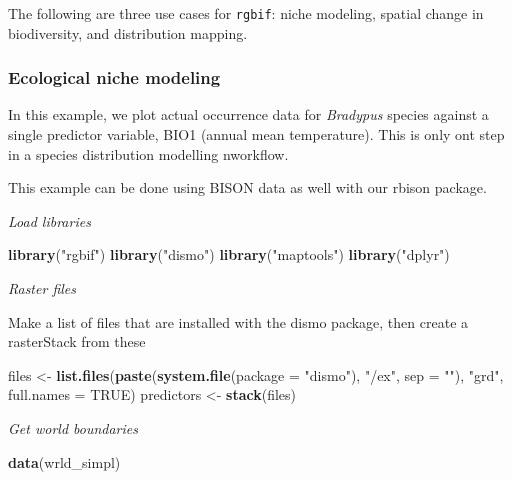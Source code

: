 \documentclass[author-year, review, 11pt]{components/elsarticle} %
\newenvironment{Shaded}{\begin{snugshade}}{\end{snugshade}}
\newcommand{\KeywordTok}[1]{\textcolor[rgb]{0.13,0.29,0.53}{\textbf{{#1}}}}
\newcommand{\DataTypeTok}[1]{\textcolor[rgb]{0.13,0.29,0.53}{{#1}}}
\newcommand{\StringTok}[1]{\textcolor[rgb]{0.31,0.60,0.02}{{#1}}}
\newcommand{\OtherTok}[1]{\textcolor[rgb]{0.56,0.35,0.01}{{#1}}}
\newcommand{\NormalTok}[1]{{#1}}
\begin{document}
The following are three use cases for \texttt{rgbif}: niche modeling,
spatial change in biodiversity, and distribution mapping.

\subsubsection{Ecological niche
modeling}\label{ecological-niche-modeling}

In this example, we plot actual occurrence data for \emph{Bradypus}
species against a single predictor variable, BIO1 (annual mean
temperature). This is only ont step in a species distribution modelling
nworkflow.

This example can be done using BISON data as well with our rbison
package.

\emph{Load libraries}

\begin{Shaded}
\begin{Highlighting}[]
\KeywordTok{library}\NormalTok{(}\StringTok{"rgbif"}\NormalTok{)}
\KeywordTok{library}\NormalTok{(}\StringTok{"dismo"}\NormalTok{)}
\KeywordTok{library}\NormalTok{(}\StringTok{"maptools"}\NormalTok{)}
\KeywordTok{library}\NormalTok{(}\StringTok{"dplyr"}\NormalTok{)}
\end{Highlighting}
\end{Shaded}

\emph{Raster files}

Make a list of files that are installed with the dismo package, then
create a rasterStack from these

\begin{Shaded}
\begin{Highlighting}[]
\NormalTok{files <-}\StringTok{ }\KeywordTok{list.files}\NormalTok{(}\KeywordTok{paste}\NormalTok{(}\KeywordTok{system.file}\NormalTok{(}\DataTypeTok{package =} \StringTok{"dismo"}\NormalTok{), }\StringTok{"/ex"}\NormalTok{, }\DataTypeTok{sep =} \StringTok{""}\NormalTok{),}
                    \StringTok{"grd"}\NormalTok{, }\DataTypeTok{full.names =} \OtherTok{TRUE}\NormalTok{)}
\NormalTok{predictors <-}\StringTok{ }\KeywordTok{stack}\NormalTok{(files)}
\end{Highlighting}
\end{Shaded}

\emph{Get world boundaries}

\begin{Shaded}
\begin{Highlighting}[]
\KeywordTok{data}\NormalTok{(wrld_simpl)}
\end{Highlighting}
\end{Shaded}
\end{document}
